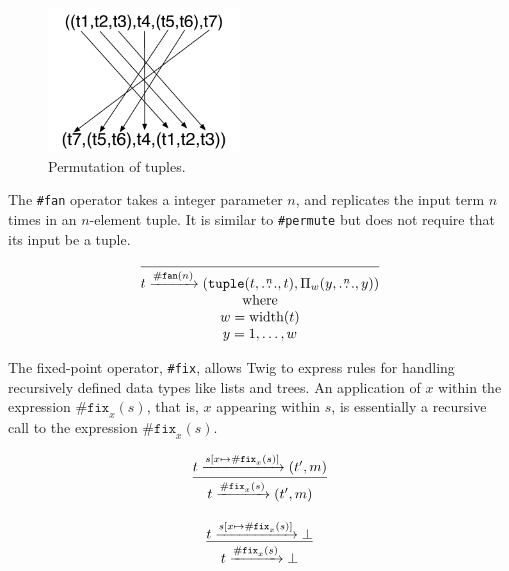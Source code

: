 \begin{figure}[ht]
\centering
\includegraphics[width=2in]{images/permute}
\caption{Permutation of tuples.}
\label{fig:permute}
\end{figure}

The \texttt{\#fan} operator takes a integer parameter $n$, and
replicates the input term $n$ times in an $n$-element tuple. It is
similar to \texttt{\#permute} but does not require that its input
be a tuple.

\begin{equation}
\begin{array}{c}
\infer
  {t \arr{\mathtt{\#fan}(n)} (\mathtt{tuple}(t,\overset{n}{\ldots},t),\Pi_w(y,\overset{n}{\ldots},y))}
  {}\\
\mbox{where}\\
w = \mbox{width}(t)\\
y = 1,\ldots,w
\end{array}
\end{equation}

The fixed-point operator, \texttt{\#fix}, allows Twig to express
rules for handling recursively defined data types like lists and
trees. An application of $x$ within the expression
$\mathtt{\#fix}_x(s)$, that is, $x$ appearing within $s$, is
essentially a recursive call to the expression
$\mathtt{\#fix}_x(s)$.

\begin{equation}
\infer
  {t \arr{\mathtt{\#fix}_x(s)} (t',m)}
  {t \arr{s[x \mapsto \mathtt{\#fix}_x(s)]} (t',m)}
\end{equation}

\begin{equation}
\infer
  {t \arr{\mathtt{\#fix}_x(s)} \bot}
  {t \arr{s[x \mapsto \mathtt{\#fix}_x(s)]} \bot}
\end{equation}

